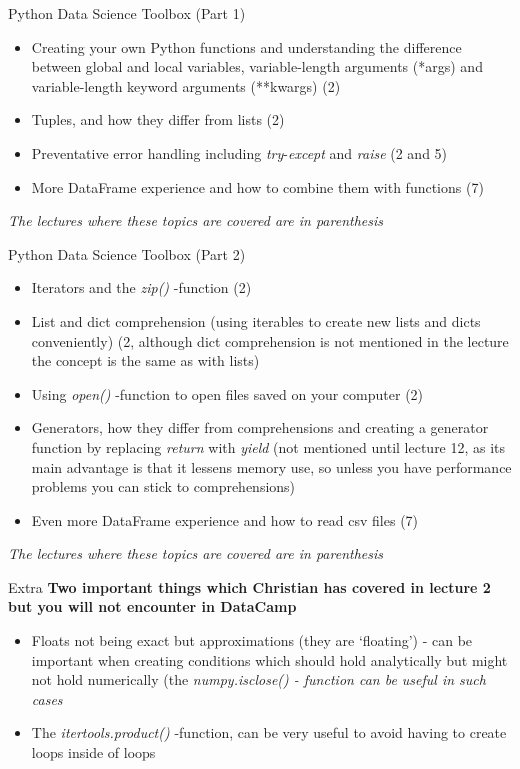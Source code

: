 \documentclass[10pt,danish,t,10pt]{beamer}
\newcommand{\code}[1]{\textit{#1}} %
\begin{document}
\begin{frame}{Python Data Science Toolbox (Part 1)}
    \begin{itemize}
        \item Creating your own Python functions and understanding the difference between global and local variables, variable-length arguments (*args) and variable-length keyword arguments (**kwargs) (2)
        \item Tuples, and how they differ from lists (2)
        \item Preventative error handling including \code{try}-\code{except} and \code{raise} (2 and 5)
        \item More DataFrame experience and how to combine them with functions (7)
    \end{itemize}
    \mbox{}
    \vfill
    \textit{The lectures where these topics are covered are in parenthesis} 
\end{frame}

\begin{frame}{Python Data Science Toolbox (Part 2)}
    \begin{itemize}
        \item Iterators and the \code{zip()} -function (2)
        \item List and dict comprehension (using iterables to create new lists and dicts conveniently) (2, although dict comprehension is not mentioned in the lecture the concept is the same as with lists)
        \item Using \code{open()} -function to open files saved on your computer (2) 
        \item Generators, how they differ from comprehensions and creating a generator function by replacing \code{return} with \code{yield} (not mentioned until lecture 12, as its main advantage is that it lessens memory use, so unless you have performance problems you can stick to comprehensions)
        \item Even more DataFrame experience and how to read csv files (7)
    \end{itemize}
    \mbox{}
    \vfill
    \textit{The lectures where these topics are covered are in parenthesis} 
\end{frame}

\begin{frame}{Extra}
    \textbf{Two important things which Christian has covered in lecture 2 but you will not encounter in DataCamp}
    \begin{itemize}
        \item Floats not being exact but approximations (they are `floating') - can be important when creating conditions which should hold analytically but might not hold numerically (the \code{numpy.isclose() - function can be useful in such cases}
        \item The \code{itertools.product()} -function, can be very useful to avoid having to create loops inside of loops
    \end{itemize}
\end{frame}
\end{document}
